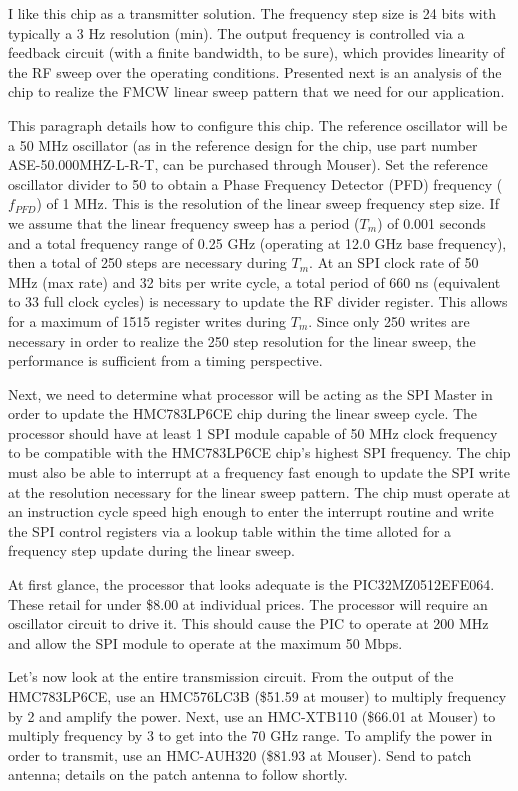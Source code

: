 \documentclass[]{article}
\begin{document}
I like this chip as a transmitter solution. The frequency step size is 24 bits with typically a 3 Hz resolution (min). The output frequency is controlled via a feedback circuit (with a finite bandwidth, to be sure), which provides linearity of the RF sweep over the operating conditions. Presented next is an analysis of the chip to realize the FMCW linear sweep pattern that we need for our application.

This paragraph details how to configure this chip. The reference oscillator will be a 50 MHz oscillator (as in the reference design for the chip, use part number ASE-50.000MHZ-L-R-T, can be purchased through Mouser). Set the reference oscillator divider to 50 to obtain a Phase Frequency Detector (PFD) frequency ($f_{PFD}$) of 1 MHz. This is the resolution of the linear sweep frequency step size. If we assume that the linear frequency sweep has a period ($T_{m}$) of 0.001 seconds and a total frequency range of 0.25 GHz (operating at 12.0 GHz base frequency), then a total of 250 steps are necessary during $T_{m}$. At an SPI clock rate of 50 MHz (max rate) and 32 bits per write cycle, a total period of 660 ns (equivalent to 33 full clock cycles) is necessary to update the RF divider register. This allows for a maximum of 1515 register writes during $T_{m}$. Since only 250 writes are necessary in order to realize the 250 step resolution for the linear sweep, the performance is sufficient from a timing perspective.

Next, we need to determine what processor will be acting as the SPI Master in order to update the HMC783LP6CE chip during the linear sweep cycle. The processor should have at least 1 SPI module capable of 50 MHz clock frequency to be compatible with the HMC783LP6CE chip's highest SPI frequency. The chip must also be able to interrupt at a frequency fast enough to update the SPI write at the resolution necessary for the linear sweep pattern. The chip must operate at an instruction cycle speed high enough to enter the interrupt routine and write the SPI control registers via a lookup table within the time alloted for a frequency step update during the linear sweep.

At first glance, the processor that looks adequate is the PIC32MZ0512EFE064. These retail for under \$8.00 at individual prices. The processor will require an oscillator circuit to drive it. This should cause the PIC to operate at 200 MHz and allow the SPI module to operate at the maximum 50 Mbps.

Let's now look at the entire transmission circuit. From the output of the HMC783LP6CE, use an HMC576LC3B (\$51.59 at mouser) to multiply frequency by 2 and amplify the power. Next, use an HMC-XTB110 (\$66.01 at Mouser) to multiply frequency by 3 to get into the 70 GHz range. To amplify the power in order to transmit, use an HMC-AUH320 (\$81.93 at Mouser). Send to patch antenna; details on the patch antenna to follow shortly.
\end{document}
